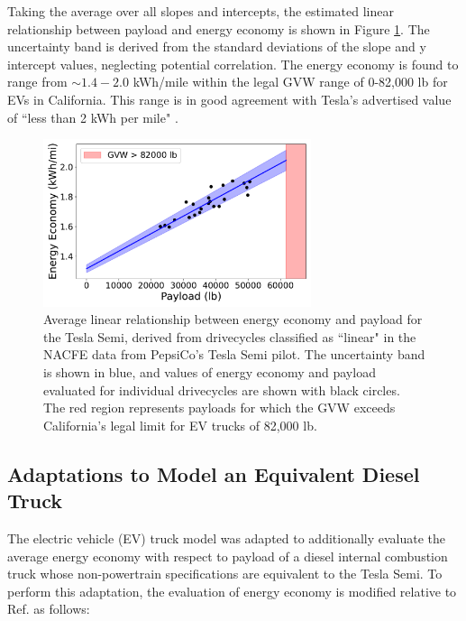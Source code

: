 Taking the average over all slopes and intercepts, the estimated linear relationship between payload and energy economy is shown in Figure \ref{fig:payload_vs_energy_economy_ev}. The uncertainty band is derived from the standard deviations of the slope and y intercept values, neglecting potential correlation. The energy economy is found to range from $\sim 1.4-2.0$ kWh/mile within the legal GVW range of 0-82,000 lb for EVs in California. This range is in good agreement with Tesla's advertised value of ``less than 2 kWh per mile" \cite{tesla_semi}. 

\begin{figure}[H]
        \centering
        \includegraphics[width=0.7\textwidth]{figures/payload_vs_energy_economy_function_ev.pdf}
        \caption{Average linear relationship between energy economy and payload for the Tesla Semi, derived from drivecycles classified as ``linear" in the NACFE data from PepsiCo's Tesla Semi pilot. The uncertainty band is shown in blue, and values of energy economy and payload evaluated for individual drivecycles are shown with black circles. The red region represents payloads for which the GVW exceeds California's legal limit for EV trucks of 82,000 lb.}
        \label{fig:payload_vs_energy_economy_ev}
\end{figure}

\subsection{Adaptations to Model an Equivalent Diesel Truck}
\label{sec:diesel_adaptations}

The electric vehicle (EV) truck model was adapted to additionally evaluate the average energy economy with respect to payload of a diesel internal combustion truck whose non-powertrain specifications are equivalent to the Tesla Semi. To perform this adaptation, the evaluation of energy economy is modified relative to Ref. \cite{Sader_2023} as follows:

